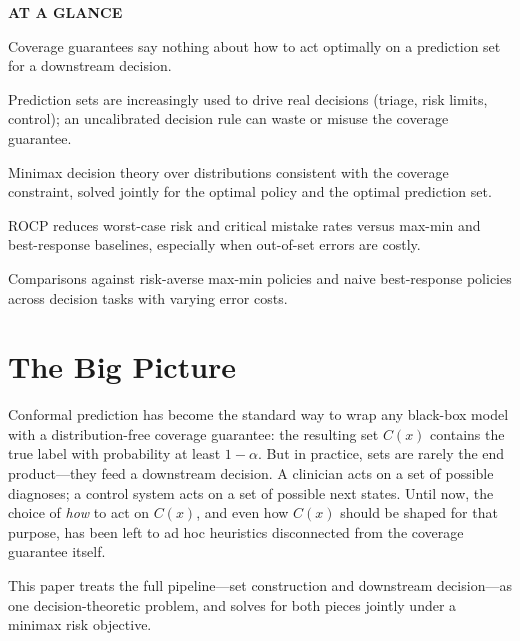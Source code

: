 \documentclass[10pt,twocolumn]{article}
\begin{document}
\begin{mdframed}[backgroundcolor=boxgray,linecolor=rulered,linewidth=1pt,
    innerleftmargin=6pt,innerrightmargin=6pt,
    innertopmargin=6pt,innerbottommargin=6pt]
\textbf{\small AT A GLANCE}\par\vspace{4pt}
\begin{description}[leftmargin=0pt,labelsep=4pt,itemsep=2pt,parsep=0pt,
    font=\small\bfseries]
  \item[Problem:] Coverage guarantees say nothing about how to act
    optimally on a prediction set for a downstream decision.
  \item[Why it matters:] Prediction sets are increasingly used to drive
    real decisions (triage, risk limits, control); an uncalibrated
    decision rule can waste or misuse the coverage guarantee.
  \item[Method:] Minimax decision theory over distributions consistent
    with the coverage constraint, solved jointly for the optimal policy
    and the optimal prediction set.
  \item[Result:] ROCP reduces worst-case risk and critical mistake rates
    versus max-min and best-response baselines, especially when
    out-of-set errors are costly.
  \item[Evidence:] Comparisons against risk-averse max-min policies and
    naive best-response policies across decision tasks with varying
    error costs.
\end{description}
\end{mdframed}

\section{The Big Picture}

Conformal prediction has become the standard way to wrap any black-box
model with a distribution-free coverage guarantee: the resulting set
$C(x)$ contains the true label with probability at least $1-\alpha$.
But in practice, sets are rarely the end product---they feed a downstream
decision. A clinician acts on a set of possible diagnoses; a control
system acts on a set of possible next states. Until now, the choice of
\emph{how} to act on $C(x)$, and even how $C(x)$ should be shaped for
that purpose, has been left to ad hoc heuristics disconnected from the
coverage guarantee itself.

This paper treats the full pipeline---set construction and downstream
decision---as one decision-theoretic problem, and solves for both pieces
jointly under a minimax risk objective.
\end{document}

